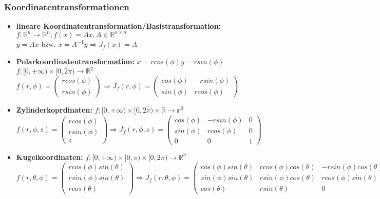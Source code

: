 \documentclass[german]{latex4ei/latex4ei_sheet}
\begin{document}
\subsubsection*{Koordinatentransformationen}
\begin{itemize}
\item \textbf{lineare Koordinatentransformation/Basistransformation:}
$f: \mathbb{R}^n \rightarrow \mathbb{R}^n, f(x)= A x, A \in \mathbb{R}^{n \times n}$\\
$y = A x$ bzw. $x= A^{-1} y \Rightarrow J_f(x)=A$\\
\item \textbf{Polarkoordinatentransformation:}
$x=r cos(\phi) y=r sin(\phi)$\\
$f: [0,+\infty) \times [0,2 \pi) \rightarrow \mathbb{R}^2$\\
$f(r,\phi)=\begin{pmatrix} r cos(\phi) \\ r sin(\phi) \end{pmatrix} \Rightarrow J_f(r,\phi)=\begin{pmatrix} cos(\phi) & -r sin(\phi) \\ sin(\phi) & r cos(\phi) \end{pmatrix}$\\
\item \textbf{Zylinderkoprdinaten:}
$f:[0,+\infty) \times [0,2 \pi) \times \mathbb{R} \rightarrow \mathbb{r}^3$\\
$f(r,\phi,z)=\begin{pmatrix} r cos(\phi) \\ r sin(\phi) \\ z \end{pmatrix} \Rightarrow J_f(r,\phi,z)=\begin{pmatrix} cos(\phi)& -r sin(\phi) & 0\\ sin(\phi) & r cos(\phi) & 0\\ 0 & 0 & 1\end{pmatrix}$\\
\item \textbf{Kugelkoordinaten:}
$f: [0,+\infty) \times [0,\pi) \times [0,2 \pi) \rightarrow \mathbb{R}^3$\\
$f(r,\theta ,\phi)=\begin{pmatrix} r cos(\phi) sin(\theta) \\ r sin(\phi) sin(\theta) \\ r cos(\theta)\end{pmatrix} \Rightarrow J_f(r,\theta,\phi)=\begin{pmatrix} cos(\phi) sin(\theta) & r cos(\phi) cos(\theta) & -r sin(\phi) cos(\theta)\\ sin(\phi) sin(\theta) & r sin(\phi) cos(\theta) & r cos(\phi) sin(\theta)\\ cos(\theta) & r sin(\theta) & 0 \end{pmatrix}$\\

\end{itemize}
\end{document}
